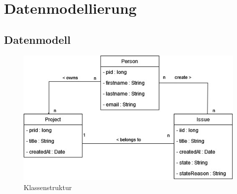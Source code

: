 \chapter{Datenmodellierung} %
\label{sec:datamodelling}


\section{Datenmodell} %
\label{sec:datenmodell}
\begin{figure}[h!]
	\centering
	\includegraphics[scale=1]{Illustrations/class_diagram.jpg}
	\caption{Klassenstruktur}
\end{figure}



